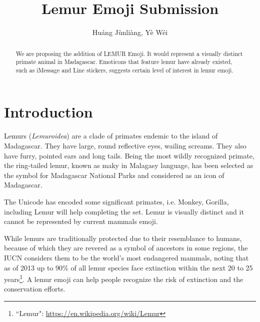 \documentclass{article}
\begin{document}
\title{Lemur Emoji Submission}
\author{Huáng Jùnliàng, Yè Wéi}

\begin{abstract}
    We are proposing the addition of LEMUR Emoji. It would represent a visually distinct primate animal in Madagascar. Emoticons that feature lemur have already existed, such as iMessage and Line stickers, suggests certain level of interest in lemur emoji.
\end{abstract} 

\section{Introduction}
Lemurs (\textit{Lemuroidea}) are a clade of primates endemic to the island of Madagascar. They have large, round reflective eyes, wailing screams. They also have furry, pointed ears and long tails. Being the most wildly recognized primate, the ring-tailed lemur, known as maky in Malagasy language, has been selected as the symbol for Madagascar National Parks and considered as an icon of Madagascar.

The Unicode has encoded some significant primates, i.e. Monkey, Gorilla, including Lemur will help completing the set. Lemur is visually distinct and it cannot be represented by current mammals emoji.

While lemurs are traditionally protected due to their resemblance to humans, because of which they are revered as a symbol of ancestors in some regions, the IUCN considers them to be the world's most endangered mammals, noting that as of 2013 up to 90\% of all lemur species face extinction within the next 20 to 25 years\footnote{``Lemur": \url{https://en.wikipedia.org/wiki/Lemur}}. A lemur emoji can help people recognize the risk of extinction and the conservation efforts.
\end{document}
